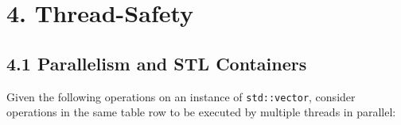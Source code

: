 \documentclass[]{article}
\begin{document}
\section{4. Thread-Safety}\label{thread-safety}

\subsection{4.1 Parallelism and STL
Containers}\label{parallelism-and-stl-containers}

Given the following operations on an instance of \texttt{std::vector},
consider operations in the same table row to be executed by multiple
threads in parallel:

\end{document}
